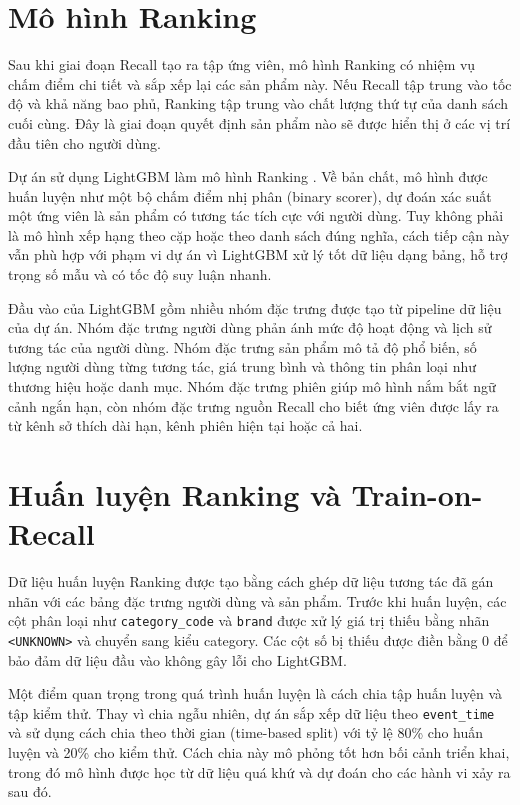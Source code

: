 \section{Mô hình Ranking}
Sau khi giai đoạn Recall tạo ra tập ứng viên, mô hình Ranking có nhiệm vụ chấm điểm chi tiết và sắp xếp lại các sản phẩm này. Nếu Recall tập trung vào tốc độ và khả năng bao phủ, Ranking tập trung vào chất lượng thứ tự của danh sách cuối cùng. Đây là giai đoạn quyết định sản phẩm nào sẽ được hiển thị ở các vị trí đầu tiên cho người dùng.
\medskip

Dự án sử dụng LightGBM làm mô hình Ranking \cite{ke2017lightgbm}. Về bản chất, mô hình được huấn luyện như một bộ chấm điểm nhị phân (binary scorer), dự đoán xác suất một ứng viên là sản phẩm có tương tác tích cực với người dùng. Tuy không phải là mô hình xếp hạng theo cặp hoặc theo danh sách đúng nghĩa, cách tiếp cận này vẫn phù hợp với phạm vi dự án vì LightGBM xử lý tốt dữ liệu dạng bảng, hỗ trợ trọng số mẫu và có tốc độ suy luận nhanh.
\medskip

Đầu vào của LightGBM gồm nhiều nhóm đặc trưng được tạo từ pipeline dữ liệu của dự án. Nhóm đặc trưng người dùng phản ánh mức độ hoạt động và lịch sử tương tác của người dùng. Nhóm đặc trưng sản phẩm mô tả độ phổ biến, số lượng người dùng từng tương tác, giá trung bình và thông tin phân loại như thương hiệu hoặc danh mục. Nhóm đặc trưng phiên giúp mô hình nắm bắt ngữ cảnh ngắn hạn, còn nhóm đặc trưng nguồn Recall cho biết ứng viên được lấy ra từ kênh sở thích dài hạn, kênh phiên hiện tại hoặc cả hai.

\section{Huấn luyện Ranking và Train-on-Recall}
Dữ liệu huấn luyện Ranking được tạo bằng cách ghép dữ liệu tương tác đã gán nhãn với các bảng đặc trưng người dùng và sản phẩm. Trước khi huấn luyện, các cột phân loại như \texttt{category\_code} và \texttt{brand} được xử lý giá trị thiếu bằng nhãn \texttt{<UNKNOWN>} và chuyển sang kiểu category. Các cột số bị thiếu được điền bằng 0 để bảo đảm dữ liệu đầu vào không gây lỗi cho LightGBM.
\medskip

Một điểm quan trọng trong quá trình huấn luyện là cách chia tập huấn luyện và tập kiểm thử. Thay vì chia ngẫu nhiên, dự án sắp xếp dữ liệu theo \texttt{event\_time} và sử dụng cách chia theo thời gian (time-based split) với tỷ lệ 80\% cho huấn luyện và 20\% cho kiểm thử. Cách chia này mô phỏng tốt hơn bối cảnh triển khai, trong đó mô hình được học từ dữ liệu quá khứ và dự đoán cho các hành vi xảy ra sau đó.
\medskip

